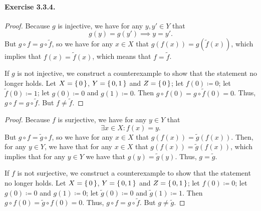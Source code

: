 \paragraph{Exercise 3.3.4.}
\begin{proof}
    Because $g$ is injective, we have for any $y,y'\in Y$ that \[ g(y)=g(y') \implies y=y' .\] But $g\circ f=g\circ \tilde{f}$, so we have for any $x\in X$ that $ g(f(x)) = g(\tilde{f}(x))$, which implies that $f(x) = \tilde{f}(x)$, which means that $f=\tilde{f}$. 


    If $g$ is not injective, we construct a counterexample to show that the statement no longer holds. Let $X=\set{0}$, $Y=\set{0,1}$ and $Z=\set{0}$; let $f(0)\coloneq{0}$; let $\tilde{f}(0)\coloneq{1}$; let $g(0)\coloneq{0}$ and $g(1)\coloneq{0}$. Then $g\circ f(0)=g\circ \tilde{f}(0)=0$. Thus, $g\circ f = g\circ \tilde{f}$. But $f\neq \tilde{f}$.
\end{proof}
\begin{proof}
    Because $f$ is surjective, we have for any $y\in Y$ that \[ \exists x\in X : f(x)=y .\] But $g\circ f=\tilde{g}\circ f$, so we have for any $x\in X$ that $g(f(x))=\tilde{g}(f(x))$. Then, for any $y\in Y$, we have that for any $x\in X$ that $g(f(x))=\tilde{g}(f(x))$, which implies that for any $y\in Y$ we have that $g(y)=\tilde{g}(y)$. Thus, $g = \tilde{g}$.


    If $f$ is not surjective, we construct a counterexample to show that the statement no longer holds. Let $X=\set{0}$, $Y=\set{0,1}$ and $Z=\set{0,1}$; let $f(0)\coloneq{0}$; let $g(0)\coloneq{0}$ and $g(1)\coloneq{0}$; let $\tilde{g}(0)\coloneq{0}$ and $\tilde{g}(1)\coloneq{1}$. Then $g\circ f(0)=\tilde{g}\circ {f}(0)=0$. Thus, $g\circ f = g\circ \tilde{f}$. But $g\neq \tilde{g}$.
\end{proof}

